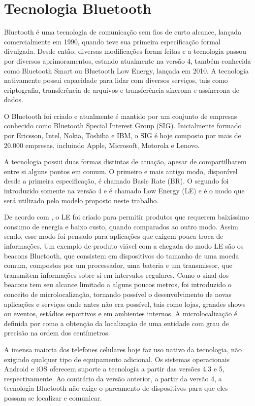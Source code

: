 \documentclass[english,brazilian]{UNISINOSmonografia}
\begin{document}
	\section{Tecnologia Bluetooth}
Bluetooth é uma tecnologia de comunicação sem fios de curto alcance, lançada comercialmente em 1990, quando teve sua primeira especificação formal divulgada. Desde então, diversas modificações foram feitas e a tecnologia passou por diversos aprimoramentos, estando atualmente na versão 4, também conhecida como Bluetooth Smart ou Bluetooth Low Energy, lançada em 2010. A tecnologia nativamente possui capacidade para lidar com diversos serviços, tais como criptografia, transferência de arquivos e transferência síncrona e assíncrona de dados.

O Bluetooth foi criado e atualmente é mantido por um conjunto de empresas conhecido como Bluetooth Special Interest Group (SIG). Inicialmente formado por Ericsson, Intel, Nokia, Toshiba e IBM, o SIG é hoje composto por mais de 20.000 empresas, incluindo Apple, Microsoft, Motorola e Lenovo.

A tecnologia possui duas formas distintas de atuação, apesar de compartilharem entre si alguns pontos em comum. O primeiro e mais antigo modo, disponível desde a primeira especificação, é chamado Basic Rate (BR). O segundo foi introduzido somente na versão 4 e é chamado Low Energy (LE) e é o modo que será utilizado pelo modelo proposto neste trabalho.

De acordo com , o LE foi criado para permitir produtos que requerem baixíssimo consumo de energia e baixo custo, quando comparados ao outro modo. Assim sendo, esse modo foi pensado para aplicações que exigem pouca troca de informações. Um exemplo de produto viável com a chegada do modo LE são os beacons Bluetooth, que consistem em dispositivos do tamanho de uma moeda comum, compostos por um processador, uma bateria e um transmissor, que transmitem informações sobre si em intervalos regulares. Como o sinal dos beacons tem seu alcance limitado a alguns poucos metros, foi introduzido o conceito de microlocalização, tornando possível o desenvolvimento de novas aplicações e serviços onde antes não era possível, tais como lojas, grandes shows ou eventos, estádios esportivos e em ambientes internos. A microlocalização é definida por  como a obtenção da localização de uma entidade com grau de precisão na ordem dos centímetros. 

A imensa maioria dos telefones celulares hoje faz uso nativo da tecnologia, não exigindo qualquer tipo de equipamento adicional. Os sistemas operacionais Android e iOS oferecem suporte a tecnologia a partir das versões 4.3 e 5, respectivamente. Ao contrário da versão anterior, a partir da versão 4, a tecnologia Bluetooth não exige o pareamento de dispositivos para que eles possam se localizar e comunicar.
\end{document}
